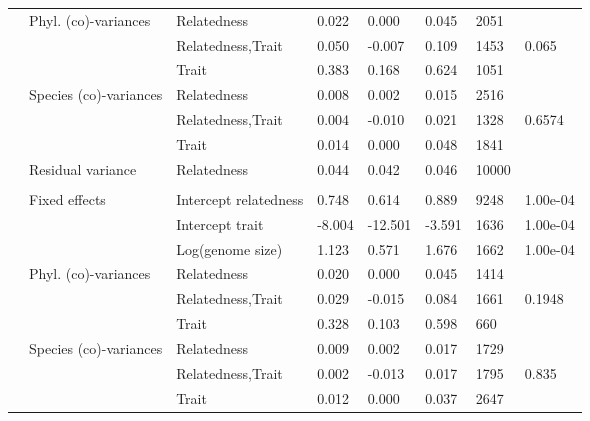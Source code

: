 \begin{longtable}[t]{llllllll}
\hspace{1em} & Phyl. (co)-variances & Relatedness & 0.022 & 0.000 & 0.045 & 2051 & \\
\hspace{1em} &  & Relatedness,Trait & 0.050 & -0.007 & 0.109 & 1453 & 0.065\\
\hspace{1em} &  & Trait & 0.383 & 0.168 & 0.624 & 1051 & \\
\hspace{1em} & Species (co)-variances & Relatedness & 0.008 & 0.002 & 0.015 & 2516 & \\
\hspace{1em} &  & Relatedness,Trait & 0.004 & -0.010 & 0.021 & 1328 & 0.6574\\
\hspace{1em} &  & Trait & 0.014 & 0.000 & 0.048 & 1841 & \\
\hspace{1em} & Residual variance & Relatedness & 0.044 & 0.042 & 0.046 & 10000 \vphantom{1} & \\
\addlinespace[0.3em]
\multicolumn{8}{l}{\textbf{Antibiotic degradation}}\\
\hspace{1em} & Fixed effects & Intercept relatedness & 0.748 & 0.614 & 0.889 & 9248 & 1.00e-04\\
\hspace{1em} &  & Intercept trait & -8.004 & -12.501 & -3.591 & 1636 & 1.00e-04\\
\hspace{1em} &  & Log(genome size) & 1.123 & 0.571 & 1.676 & 1662 & 1.00e-04\\
\hspace{1em} & Phyl. (co)-variances & Relatedness & 0.020 & 0.000 & 0.045 & 1414 & \\
\hspace{1em} &  & Relatedness,Trait & 0.029 & -0.015 & 0.084 & 1661 & 0.1948\\
\hspace{1em} &  & Trait & 0.328 & 0.103 & 0.598 & 660 & \\
\hspace{1em} & Species (co)-variances & Relatedness & 0.009 & 0.002 & 0.017 & 1729 & \\
\hspace{1em} &  & Relatedness,Trait & 0.002 & -0.013 & 0.017 & 1795 & 0.835\\
\hspace{1em} &  & Trait & 0.012 & 0.000 & 0.037 & 2647 & \\

\end{longtable}
